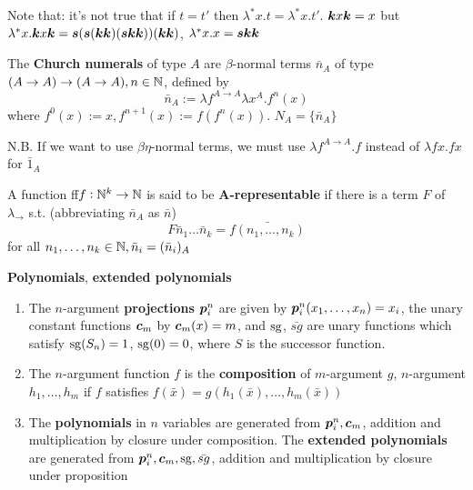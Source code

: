\documentclass[11pt]{article}
\begin{document}
\begin{remark}
Note that: it's not true that if \(t=t'\) then \(\lambda^*x.t=\lambda^*x.t'\). 
\(\boldsymbol{k} x\boldsymbol{k}=x\) but \(\lambda^*x.\boldsymbol{k} x\boldsymbol{k}=\boldsymbol{s}(\boldsymbol{s}(\boldsymbol{k}\boldsymbol{k})(\boldsymbol{s}\boldsymbol{k}\boldsymbol{k}))(\boldsymbol{k}\boldsymbol{k})\),
\(\lambda^*x.x=\boldsymbol{s}\boldsymbol{k}\boldsymbol{k}\)
\end{remark}

\begin{definition}[]
The \textbf{Church numerals} of type \(A\) are \(\beta\)-normal terms \(\bar{n}_A\) of type 
\((A\to A)\to(A\to A), n\in\mathbb{N}\), defined by
\begin{equation*}
\bar{n}_A:=\lambda f^{A\to A}\lambda x^A.f^n(x)
\end{equation*}
where \(f^0(x):=x,f^{n+1}(x):=f(f^n(x))\). \(N_A=\{\bar{n}_A\}\)
\end{definition}
N.B. If we want to use \(\beta \eta\)-normal terms, we must use \(\lambda f^{A\to
   A}.f\) instead of \(\lambda fx.fx\) for \(\bar{1}_A\)

\begin{definition}[]
A function ff\(f:\mathbb{N}^k\to\mathbb{N}\) is said to be \textbf{A-representable} if there is a term \(F\)
of \(\lambda_\to\) s.t. (abbreviating \(\bar{n}_A\) as \(\bar{n}\))
\begin{equation*}
F\bar{n}_1\dots\bar{n}_k=\bar{f(n_1,\dots,n_k)}
\end{equation*}
for all \(n_1,\dots,n_k\in\mathbb{N},\bar{n}_i=(\bar{n}_i)_A\)
\end{definition}


\begin{definition}[]
\textbf{Polynomials}, \textbf{extended polynomials}
\begin{enumerate}
\item The \(n\)-argument \textbf{projections} \(\boldsymbol{p}_i^n\) are given by
\(\boldsymbol{p}_i^n(x_1,\dots,x_n)=x_i\), the unary constant functions \(\boldsymbol{c}_m\) by
\(\boldsymbol{c}_m(x)=m\), and \(\operatorname{sg}\), \(\bar{sg}\) are unary functions which satisfy
\(\operatorname{sg}(S_n)=1\), \(\operatorname{sg}(0)=0\), where \(S\) is the successor function.
\item The \(n\)-argument function \(f\) is the \textbf{composition} of \(m\)-argument \(g\),
\(n\)-argument \(h_1,\dots,h_m\) if \(f\) satisfies
\(f(\bar{x})=g(h_1(\bar{x}),\dots,h_m(\bar{x}))\)
\item The \textbf{polynomials} in \(n\) variables are generated from \(\boldsymbol{p}_i^n,\boldsymbol{c}_m\),
addition and multiplication by closure under composition. The \textbf{extended
polynomials} are generated from \(\boldsymbol{p}_i^n,\boldsymbol{c}_m,\operatorname{sg},\bar{sg}\), addition and
multiplication by closure under proposition
\end{enumerate}
\end{definition}
\end{document}
